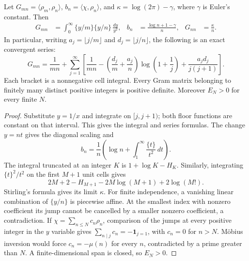 \begin{proposition}
\label{prop:ns53-nb-entries}
Let $G_{mn}=\langle\rho_m,\rho_n\rangle$, $b_n=\langle\chi,\rho_n\rangle$,
and $\kappa=\log(2\pi)-\gamma$, where $\gamma$ is Euler's constant.
Then
\begin{align}
 G_{mn}&=\int_0^\infty\{y/m\}\{y/n\}\,\frac{dy}{y^2},
 & b_n&=\frac{\log n+1-\gamma}{n},
 &G_{nn}&=\frac{\kappa}{n}.\label{eq:ns53-nb-entries}
\end{align}
In particular, writing $a_j=\lfloor j/m\rfloor$ and
$d_j=\lfloor j/n\rfloor$, the following is an exact convergent series:
\begin{equation}
 G_{mn}=\frac1{mn}+\sum_{j=1}^{\infty}
 \left[\frac1{mn}-\left(\frac{d_j}{m}+\frac{a_j}{n}\right)
 \log\left(1+\frac1j\right)+\frac{a_jd_j}{j(j+1)}\right].
 \label{eq:ns53-nb-gram-series}
\end{equation}
Each bracket is a nonnegative cell integral. Every Gram matrix belonging
to finitely many distinct positive integers is positive definite.
Moreover $E_N>0$ for every finite $N$.
\end{proposition}

\begin{proof}
Substitute $y=1/x$ and integrate on $[j,j+1)$; both floor functions
are constant on that interval. This gives the integral and series formulas.
The change $y=nt$ gives the diagonal scaling and
\[
 b_n=\frac1n\left(\log n+\int_1^\infty\frac{\{t\}}{t^2}\,dt\right).
\]
The integral truncated at an integer $K$ is $1+\log K-H_K$.
Similarly, integrating $\{t\}^2/t^2$ on the first $M+1$ unit cells gives
\[
 2M+2-H_{M+1}-2M\log(M+1)+2\log(M!).
\]
Stirling's formula gives its limit $\kappa$. For finite independence,
a vanishing linear combination of $\{y/n\}$ is piecewise affine.
At the smallest index with nonzero coefficient its jump cannot be
cancelled by a smaller nonzero coefficient, a contradiction. If
$\chi=\sum_{n\leq N}c_n\rho_n$, comparison of the jumps at every positive
integer in the $y$ variable gives
$\sum_{n\mid j}c_n=-\mathbf 1_{j=1}$, with $c_n=0$ for $n>N$.
M\"obius inversion would force $c_n=-\mu(n)$ for every $n$, contradicted
by a prime greater than $N$. A finite-dimensional span is closed, so
$E_N>0$.
\end{proof}

